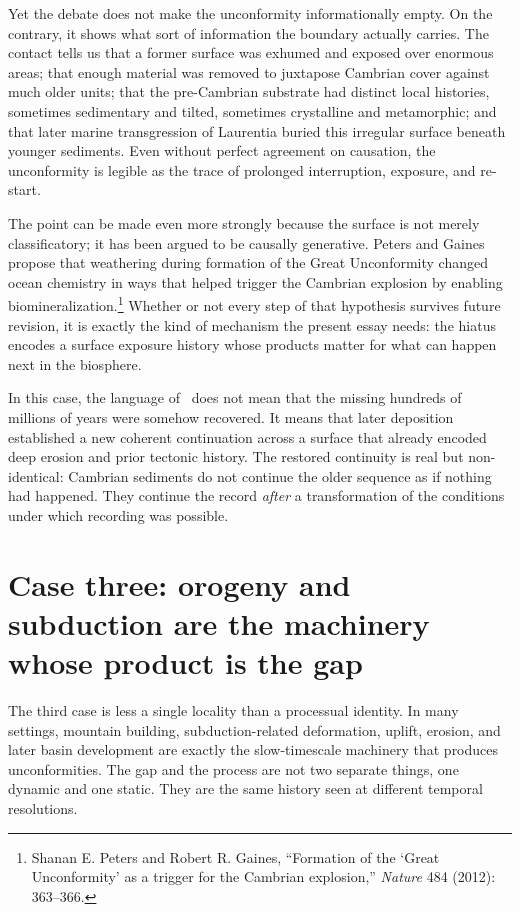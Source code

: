 \documentclass[11pt]{article}
\begin{document}
Yet the debate does not make the unconformity informationally empty. On the contrary, it shows what sort of information the boundary actually carries. The contact tells us that a former surface was exhumed and exposed over enormous areas; that enough material was removed to juxtapose Cambrian cover against much older units; that the pre-Cambrian substrate had distinct local histories, sometimes sedimentary and tilted, sometimes crystalline and metamorphic; and that later marine transgression of Laurentia buried this irregular surface beneath younger sediments. Even without perfect agreement on causation, the unconformity is legible as the trace of prolonged interruption, exposure, and re-start.

The point can be made even more strongly because the surface is not merely classificatory; it has been argued to be causally generative. Peters and Gaines propose that weathering during formation of the Great Unconformity changed ocean chemistry in ways that helped trigger the Cambrian explosion by enabling biomineralization.\footnote{Shanan E. Peters and Robert R. Gaines, ``Formation of the `Great Unconformity' as a trigger for the Cambrian explosion,'' \emph{Nature} 484 (2012): 363--366.} Whether or not every step of that hypothesis survives future revision, it is exactly the kind of mechanism the present essay needs: the hiatus encodes a surface exposure history whose products matter for what can happen next in the biosphere.

In this case, the language of \repair\ does not mean that the missing hundreds of millions of years were somehow recovered. It means that later deposition established a new coherent continuation across a surface that already encoded deep erosion and prior tectonic history. The restored continuity is real but non-identical: Cambrian sediments do not continue the older sequence as if nothing had happened. They continue the record \emph{after} a transformation of the conditions under which recording was possible.

\section{Case three: orogeny and subduction are the machinery whose product is the gap}
The third case is less a single locality than a processual identity. In many settings, mountain building, subduction-related deformation, uplift, erosion, and later basin development are exactly the slow-timescale machinery that produces unconformities. The gap and the process are not two separate things, one dynamic and one static. They are the same history seen at different temporal resolutions.
\end{document}
